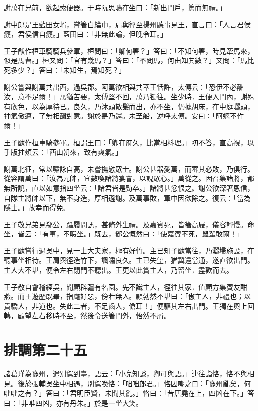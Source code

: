 謝萬在兄前，欲起索便器。于時阮思曠在坐曰：「新出門戶，篤而無禮。」

謝中郎是王藍田女壻，嘗箸白綸巾，肩輿徑至揚州聽事見王，直言曰：「人言君侯癡，君侯信自癡。」藍田曰：「非無此論，但晚令耳。」

王子猷作桓車騎騎兵參軍，桓問曰：「卿何署？」答曰：「不知何署，時見牽馬來，似是馬曹。」桓又問：「官有幾馬？」答曰：「不問馬，何由知其數？」又問：「馬比死多少？」答曰：「未知生，焉知死？」

謝公嘗與謝萬共出西，過吳郡。阿萬欲相與共萃王恬許，太傅云：「恐伊不必酬汝，意不足爾！」萬猶苦要，太傅堅不回，萬乃獨往。坐少時，王便入門內，謝殊有欣色，以為厚待已。良久，乃沐頭散髮而出，亦不坐，仍據胡床，在中庭曬頭，神氣傲邁，了無相酬對意。謝於是乃還。未至船，逆呼太傅。安曰：「阿螭不作爾！」

王子猷作桓車騎參軍。桓謂王曰：「卿在府久，比當相料理。」初不答，直高視，以手版拄頰云：「西山朝來，致有爽氣。」

謝萬北征，常以嘯詠自高，未嘗撫慰眾士。謝公甚器愛萬，而審其必敗，乃俱行。從容謂萬曰：「汝為元帥，宜數喚諸將宴會，以說眾心。」萬從之。因召集諸將，都無所說，直以如意指四坐云：「諸君皆是勁卒。」諸將甚忿恨之。謝公欲深箸恩信，自隊主將帥以下，無不身造，厚相遜謝。及萬事敗，軍中因欲除之。復云：「當為隱士。」故幸而得免。

王子敬兄弟見郗公，躡履問訊，甚脩外生禮。及嘉賓死，皆箸高屐，儀容輕慢。命坐，皆云：「有事，不暇坐。」既去，郗公慨然曰：「使嘉賓不死，鼠輩敢爾！」

王子猷嘗行過吳中，見一士大夫家，極有好竹。主已知子猷當往，乃灑埽施設，在聽事坐相待。王肩輿徑造竹下，諷嘯良久。主已失望，猶冀還當通，遂直欲出門。主人大不堪，便令左右閉門不聽出。王更以此賞主人，乃留坐，盡歡而去。

王子敬自會稽經吳，聞顧辟疆有名園。先不識主人，徑往其家，值顧方集賓友酣燕。而王遊歷既畢，指麾好惡，傍若無人。顧勃然不堪曰：「傲主人，非禮也；以貴驕人，非道也。失此二者，不足齒人，傖耳！」便驅其左右出門。王獨在輿上回轉，顧望左右移時不至，然後令送箸門外，怡然不屑。



\chapter{排調第二十五}

諸葛瑾為豫州，遣別駕到臺，語云：「小兒知談，卿可與語。」連往詣恪，恪不與相見。後於張輔吳坐中相遇，別駕喚恪：「咄咄郎君。」恪因嘲之曰：「豫州亂矣，何咄咄之有？」答曰：「君明臣賢，未聞其亂。」恪曰：「昔唐堯在上，四凶在下。」答曰：「非唯四凶，亦有丹朱。」於是一坐大笑。

